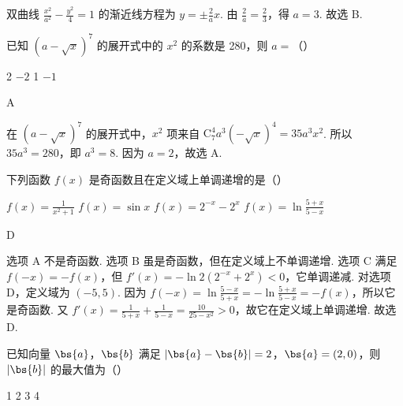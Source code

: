 \begin{solution}
双曲线 \( \frac{x^2}{a^2}-\frac{y^2}{4}=1 \) 的渐近线方程为 \( y=\pm \frac{2}{a}x \). 由 \( \frac{2}{a}=\frac{2}{3} \)，得 \( a=3 \). 故选 B.
\end{solution}

\begin{problem}
已知 \( \left( a-\sqrt{x} \right)^7 \) 的展开式中的 \( x^2 \) 的系数是 280，则 \( a=\)（\quad）

\choices
    {2}
    {\(-2\)}
    {1}
    {\(-1\)}
\end{problem}

\begin{answer}
A
\end{answer}

\begin{solution}
在 \( \left( a-\sqrt{x} \right)^7 \) 的展开式中，\( x^2 \) 项来自 \( \mathrm C_7^4 a^3\left( -\sqrt{x} \right)^4=35a^3x^2 \). 所以 \( 35a^3=280 \)，即 \( a^3=8 \). 因为 \( a=2 \)，故选 A.
\end{solution}

\begin{problem}
下列函数 \( f(x) \) 是奇函数且在定义域上单调递增的是（\quad）

\choices
    {\( f(x)=\frac{1}{x^2+1} \)}
    {\( f(x)=\sin x \)}
    {\( f(x)=2^{-x}-2^x \)}
    {\( f(x)=\ln \frac{5+x}{5-x} \)}
\end{problem}

\begin{answer}
D
\end{answer}

\begin{solution}
选项 A 不是奇函数. 选项 B 虽是奇函数，但在定义域上不单调递增. 选项 C 满足 \( f\left( -x \right)=-f\left( x \right) \)，但 \( f'\left( x \right)=-\ln 2\left( 2^{-x}+2^x \right)<0 \)，它单调递减.
对选项 D，定义域为 \( \left( -5,5 \right) \). 因为 \( f\left( -x \right)=\ln \frac{5-x}{5+x}=-\ln \frac{5+x}{5-x}=-f\left( x \right) \)，所以它是奇函数. 又 \( f'\left( x \right)=\frac{1}{5+x}+\frac{1}{5-x}=\frac{10}{25-x^2}>0 \)，故它在定义域上单调递增. 故选 D.
\end{solution}

\begin{problem}
已知向量 \( \bs{a} \)，\( \bs{b} \) 满足 \( \left| \bs{a}-\bs{b} \right|=2 \)，\( \bs{a}=\left( 2,0 \right) \)，则 \( \left| \bs{b} \right| \) 的最大值为（\quad）

\choices
    {1}
    {2}
    {3}
    {4}
\end{problem}

